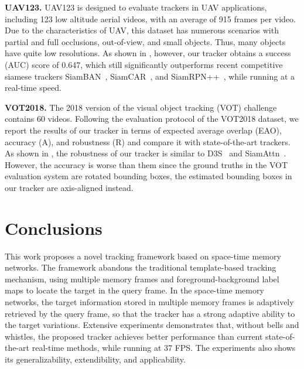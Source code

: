 \documentclass[final]{cvpr}
\begin{document}
\textbf{UAV123.}
UAV123 \cite{mueller2016benchmark} is designed to evaluate trackers in UAV applications, including 123 low altitude aerial videos, with an average of 915 frames per video.
Due to the characteristics of UAV, this dataset has numerous scenarios with partial and full occlusions, out-of-view, and small objects.
Thus, many objects have quite low resolutions.
As shown in , however, our tracker obtains a success (AUC) score of 0.647, which still significantly outperforms recent competitive siamese trackers SiamBAN~\cite{chen2020siamese}, SiamCAR~\cite{guo2020siamcar}, and SiamRPN++~\cite{li2019siamrpn++}, while running at a real-time speed.
\par
\textbf{VOT2018.}
The 2018 version of the visual object tracking (VOT) challenge \cite{kristan2018sixth} contains 60 videos.
Following the evaluation protocol of the VOT2018 dataset, we report the results of our tracker in terms of expected average overlap (EAO), accuracy (A), and robustness (R) and compare it with state-of-the-art trackers.
As shown in , the robustness of our tracker is similar to D3S~\cite{lukezic2020d3s} and SiamAttn~\cite{yu2020deformable}.
However, the accuracy is worse than them since the ground truths in the VOT evaluation system are rotated bounding boxes, the estimated bounding boxes in our tracker are axis-aligned instead.

\section{Conclusions}
This work proposes a novel tracking framework based on space-time memory networks.
The framework abandons the traditional template-based tracking mechanism, using multiple memory frames and foreground-background label maps to locate the target in the query frame.
In the space-time memory networks, the target information stored in multiple memory frames is adaptively retrieved by the query frame, so that the tracker has a strong adaptive ability to the target variations.
Extensive experiments demonstrates that, without bells and whistles, the proposed tracker achieves better performance than current state-of-the-art real-time methods, while running at 37 FPS.
The experiments also shows its generalizability, extendibility, and applicability.

{\small


}
\end{document}
